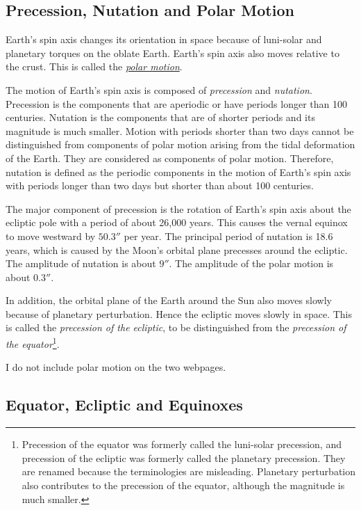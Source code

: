 \documentclass[12pt]{article}
\begin{document}
\subsection{Precession, Nutation and Polar Motion}

Earth's spin axis changes its orientation in space because of 
luni-solar and planetary torques on the oblate Earth. 
Earth's spin axis also moves relative to the crust. This is called the 
\href{https://en.wikipedia.org/wiki/Polar_motion}{\it polar motion}. 

The motion of Earth's spin axis is composed of {\em precession} and {\em nutation}. 
Precession is the components that are aperiodic or have periods longer 
than 100 centuries. Nutation is the components that are of shorter periods 
and its magnitude is much smaller. Motion with periods shorter than two days 
cannot be distinguished from components of polar motion arising from the tidal 
deformation of the Earth. They are considered as components of polar motion. 
Therefore, nutation is defined as the periodic components in the motion of 
Earth's spin axis with periods longer than two days but shorter than about 100 centuries. 

The major component of precession is the rotation of Earth's spin axis about the 
ecliptic pole with a period of about 26,000 years. This causes the vernal equinox 
to move westward by $50.3''$ per year. The principal period of nutation 
is 18.6 years, which is caused by the Moon's orbital plane precesses around 
the ecliptic. The amplitude of nutation is about $9''$. The amplitude 
of the polar motion is about $0.3''$.

In addition, the orbital plane 
of the Earth around the Sun also moves slowly because of planetary perturbation. 
Hence the ecliptic moves slowly in space. This is called the 
{\em precession of the ecliptic}, to be distinguished from 
the {\em precession of the equator}\footnote{Precession of the equator was 
formerly called the luni-solar precession, and precession of the ecliptic 
was formerly called the planetary precession. They are renamed because the 
terminologies are misleading. Planetary perturbation also contributes to 
the precession of the equator, although the magnitude is much smaller.}. 

I do not include polar motion on the two webpages.

\subsection{Equator, Ecliptic and Equinoxes}
\end{document}
